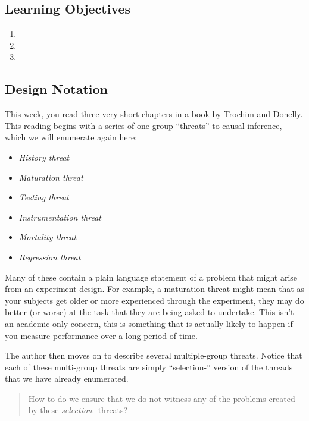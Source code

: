 \documentclass[
]{article}
\providecommand{\tightlist}{%
  \setlength{\itemsep}{0pt}\setlength{\parskip}{0pt}}
\begin{document}
\hypertarget{learning-objectives-5}{%
\subsection{Learning Objectives}\label{learning-objectives-5}}

\begin{enumerate}
\def\labelenumi{\arabic{enumi}.}
\tightlist
\item
\item
\item
\end{enumerate}

\hypertarget{design-notation}{%
\subsection{Design Notation}\label{design-notation}}

This week, you read three very short chapters in a book by Trochim and Donelly. This reading begins with a series of one-group ``threats'' to causal inference, which we will enumerate again here:

\begin{itemize}
\tightlist
\item
  \emph{History threat}
\item
  \emph{Maturation threat}
\item
  \emph{Testing threat}
\item
  \emph{Instrumentation threat}
\item
  \emph{Mortality threat}
\item
  \emph{Regression threat}
\end{itemize}

Many of these contain a plain language statement of a problem that might arise from an experiment design. For example, a maturation threat might mean that as your subjects get older or more experienced through the experiment, they may do better (or worse) at the task that they are being asked to undertake. This isn't an academic-only concern, this is something that is actually likely to happen if you measure performance over a long period of time.

The author then moves on to describe several multiple-group threats. Notice that each of these multi-group threats are simply ``selection-'' version of the threads that we have already enumerated.

\begin{quote}
How to do we ensure that we do not witness any of the problems created by these \emph{selection-} threats?
\end{quote}
\end{document}
